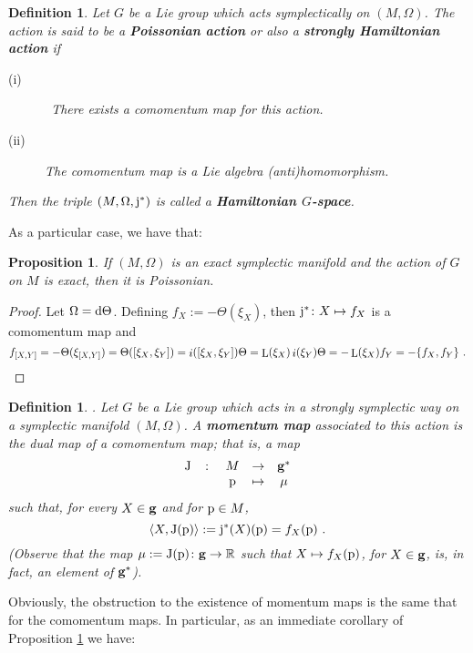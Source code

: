 \documentclass[12pt]{report}
\newtheorem{prop}[teor]{Proposition}
\newtheorem{definition}[teor]{Definition}
\def\qed{\ifvmode\removelastskip\fi
{\unskip\nobreak\hfil\penalty50\hbox{}\nobreak\hfil
\hbox{\vrule height1.2ex width1.2ex}\parfillskip=0pt
\finalhyphendemerits=0 \par\smallskip}}
\def\d{{\rm d}}
\def\Real{\mathbb{R}}
\def\Lie{\mathop{\rm L}\nolimits}
\def\inn{\mathop{i}\nolimits}
\begin{document}
\begin{definition}
Let $G$ be a Lie group which acts symplectically on $(M,\Omega)$.
The action is said to be a \textbf{Poissonian action} 
or also a \textbf{strongly Hamiltonian action} if
\begin{description}
\item[{\rm (i)}] \ 
There exists a comomentum map for this action.
\item[{\rm (ii)}]
The comomentum map is a Lie algebra (anti)homomorphism.
\end{description}
Then the triple $(M,\Omega,{\rm j}^*)$ is called a
\textbf{Hamiltonian $G$-space}.
\end{definition}

As a particular case, we have that:

\begin{prop}
If $(M,\Omega )$ is an exact symplectic manifold
and the action of $G$ on $M$ is exact, then it is Poissonian.
\label{exact}
\end{prop}
\begin{proof}
Let $\Omega =\d \Theta$.
Defining $f_X := -\Theta (\xi_X)$, then
${\rm j}^* \colon X \mapsto f_X$ is a comomentum map and
$$
f_{[X,Y]}=-\Theta (\xi_{[X,Y]}) = 
\Theta ([\xi_X,\xi_Y]) = \inn([\xi_X,\xi_Y])\Theta
=\Lie(\xi_X)\inn(\xi_Y)\Theta = 
-\Lie(\xi_X)f_Y = -\{ f_X,f_Y \} \ .
$$
\qed  \end{proof}

\begin{definition}
\cite{So-ssd}.
Let $G$ be a Lie group which acts 
in a strongly symplectic way on a symplectic manifold $(M,\Omega)$.
A \textbf{momentum map} associated to this action
is the dual map of a comomentum map; that is, a map
$$
\begin{array}{ccccc}
{\rm J}&\colon&M&\to&{\bf g}^*
\\
& &{\rm p}&\mapsto&\mu
\end{array}
$$
such that, for every $X \in {\bf g}$ and for ${\rm p}\in M$,
$$
\langle X,{\rm J}({\rm p})\rangle:={\rm j}^*(X)({\rm p})=f_X({\rm p}) \ .
$$
(Observe that the map
$\mu:= {\rm J}({\rm p})\colon{\bf g}\to\Real$ such that 
$X\mapsto f_X({\rm p})$, for $X\in{\bf g}$,
is, in fact, an element of ${\bf g}^*$).
\end{definition}

Obviously, the obstruction to the existence of momentum maps is
the same that for the comomentum maps.
In particular, as an immediate corollary of Proposition
\ref{exact} we have:
\end{document}
